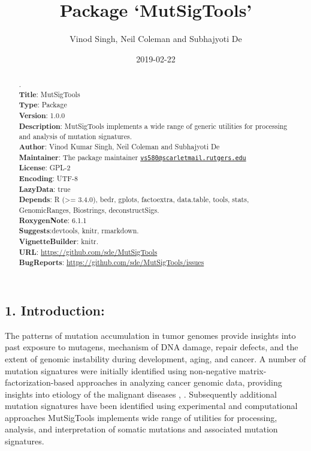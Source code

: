 \documentclass[]{article}
\title{Package `MutSigTools'}
\author{Vinod Singh, Neil Coleman and Subhajyoti De}
\date{2019-02-22}
\begin{document}
\maketitle
\begin{abstract}
.\\
\textbf{Title}: MutSigTools\\
\textbf{Type}: Package\\
\textbf{Version}: 1.0.0\\
\textbf{Description}: MutSigTools implements a wide range of generic
utilities for processing and analysis of mutation signatures.\\
\textbf{Author}: Vinod Kumar Singh, Neil Coleman and Subhajyoti De\\
\textbf{Maintainer}: The package maintainer
\href{mailto:vs580@scarletmail.rutgers.edu}{\nolinkurl{vs580@scarletmail.rutgers.edu}}\\
\textbf{License}: GPL-2\\
\textbf{Encoding}: UTF-8\\
\textbf{LazyData}: true\\
\textbf{Depends}: R (\textgreater{}= 3.4.0), bedr, gplots, factoextra,
data.table, tools, stats, GenomicRanges, Biostrings, deconstructSigs.\\
\textbf{RoxygenNote}: 6.1.1\\
\textbf{Suggests}:devtools, knitr, rmarkdown.\\
\textbf{VignetteBuilder}: knitr.\\
\textbf{URL}: \url{https://github.com/sde/MutSigTools}\\
\textbf{BugReports}: \url{https://github.com/sde/MutSigTools/issues}
\end{abstract}

\newpage

\tableofcontents

\subsection{1. Introduction:}\label{introduction}

The patterns of mutation accumulation in tumor genomes provide insights
into past exposure to mutagens, mechanism of DNA damage, repair defects,
and the extent of genomic instability during development, aging, and
cancer. A number of mutation signatures were initially identified using
non-negative matrix-factorization-based approaches in analyzing cancer
genomic data, providing insights into etiology of the malignant diseases
\citet{alexandrov2013signatures}, \citet{alexandrov2014mutational}.
Subsequently additional mutation signatures have been identified using
experimental and computational approaches \citet{boot2018depth}
MutSigTools implements wide range of utilities for processing, analysis,
and interpretation of somatic mutations and associated mutation
signatures.
\end{document}
